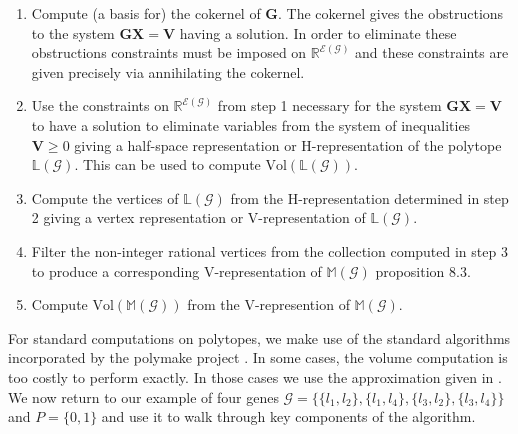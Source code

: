 \begin{enumerate}
\item Compute (a basis for) the cokernel of $\mathbf{G}$. The cokernel gives the obstructions to the system $\mathbf{G}\mathbf{X}=\mathbf{V}$ having a solution. In order to eliminate these obstructions constraints must be imposed on $\mathbb{R}^{\mathcal{E}(\mathcal{G})}$ and these constraints are given precisely via annihilating the cokernel.
\item Use the constraints on $\mathbb{R}^{\mathcal{E}(\mathcal{G})}$ from step 1 necessary for the system $\mathbf{G}\mathbf{X}=\mathbf{V}$ to have a solution to eliminate variables from the system of inequalities $\mathbf{V} \geq 0$ giving a half-space representation or H-representation of the polytope $\mathbb{L}(\mathcal{G})$. This can be used to compute $\text{Vol}(\mathbb{L}(\mathcal{G}))$.
\item Compute the vertices of $\mathbb{L}(\mathcal{G})$ from the H-representation determined in step 2 giving a vertex representation or V-representation of $\mathbb{L}(\mathcal{G})$.
\item Filter the non-integer rational vertices from the collection computed in step 3 to produce a corresponding V-representation of $\mathbb{M}(\mathcal{G})$ \cite{Wainwright2007} proposition 8.3.
\item Compute $\text{Vol}(\mathbb{M}(\mathcal{G}))$ from the V-represention of $\mathbb{M}(\mathcal{G})$.
\end{enumerate}

For standard computations on polytopes, we make use of the standard algorithms incorporated by the polymake project \cite{Gawrilow2000}. In some cases, the volume computation is too costly to perform exactly. In those cases we use the approximation given in \cite{Cousins}.  We now return to our example of four genes $\mathcal{G} = \{\{l_1,l_2 \},\{l_1,l_4 \},\{l_3,l_2\},\{l_3,l_4\} \}$ and $P=\{0,1\}$ and use it to walk through key components of the algorithm.

